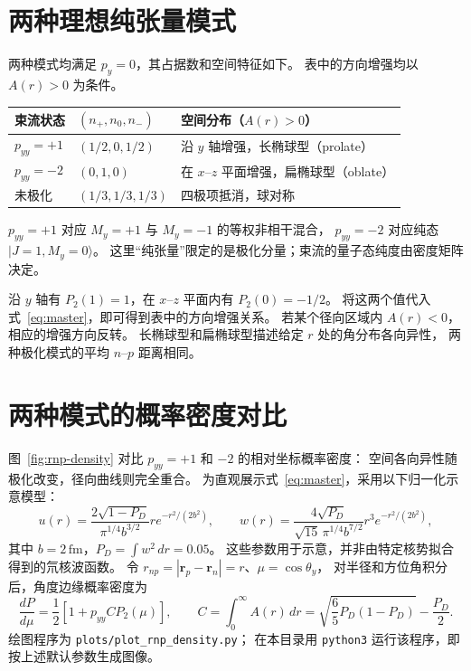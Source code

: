 \documentclass[11pt,a4paper]{ctexart}
\begin{document}
\section{两种理想纯张量模式}

两种模式均满足 $p_y=0$，其占据数和空间特征如下。
表中的方向增强均以 $A(r)>0$ 为条件。
\begin{center}
\begin{tabular}{>{\centering\arraybackslash}p{2.3cm}
                >{\centering\arraybackslash}p{3.4cm}
                p{7.1cm}}
\toprule
束流状态 & $(n_+,n_0,n_-)$ & 空间分布（$A(r)>0$）\\
\midrule
$p_{yy}=+1$ & $(1/2,0,1/2)$ & 沿 $y$ 轴增强，长椭球型（prolate）\\
$p_{yy}=-2$ & $(0,1,0)$ & 在 $x$--$z$ 平面增强，扁椭球型（oblate）\\
未极化 & $(1/3,1/3,1/3)$ & 四极项抵消，球对称\\
\bottomrule
\end{tabular}
\end{center}

$p_{yy}=+1$ 对应 $M_y=+1$ 与 $M_y=-1$ 的等权非相干混合，
$p_{yy}=-2$ 对应纯态 $|J=1,M_y=0\rangle$。
这里“纯张量”限定的是极化分量；束流的量子态纯度由密度矩阵决定。

沿 $y$ 轴有 $P_2(1)=1$，在 $x$--$z$ 平面内有 $P_2(0)=-1/2$。
将这两个值代入式~\eqref{eq:master}，即可得到表中的方向增强关系。
若某个径向区域内 $A(r)<0$，相应的增强方向反转。
长椭球型和扁椭球型描述给定 $r$ 处的角分布各向异性，
两种极化模式的平均 $n$--$p$ 距离相同。

\clearpage
\section{两种模式的概率密度对比}

图~\ref{fig:rnp-density} 对比 $p_{yy}=+1$ 和 $-2$ 的相对坐标概率密度：
空间各向异性随极化改变，径向曲线则完全重合。
为直观展示式~\eqref{eq:master}，采用以下归一化示意模型：
\begin{equation}
u(r)=\frac{2\sqrt{1-P_D}}{\pi^{1/4}b^{3/2}}r e^{-r^2/(2b^2)},
\qquad
w(r)=\frac{4\sqrt{P_D}}{\sqrt{15}\,\pi^{1/4}b^{7/2}}r^3 e^{-r^2/(2b^2)},
\label{eq:plot-model}
\end{equation}
其中 $b=2\,\mathrm{fm}$，$P_D=\int w^2\,dr=0.05$。
这些参数用于示意，并非由特定核势拟合得到的氘核波函数。
令 $r_{np}=|\bm r_p-\bm r_n|=r$、$\mu=\cos\theta_y$，
对半径和方位角积分后，角度边缘概率密度为
\begin{equation}
\frac{dP}{d\mu}=\frac12[1+p_{yy}C P_2(\mu)],\qquad
C=\int_0^\infty A(r)\,dr
=\sqrt{\frac65P_D(1-P_D)}-\frac{P_D}{2}.
\end{equation}
绘图程序为 \texttt{plots/plot\_rnp\_density.py}；
在本目录用 \texttt{python3} 运行该程序，即按上述默认参数生成图像。
\end{document}
